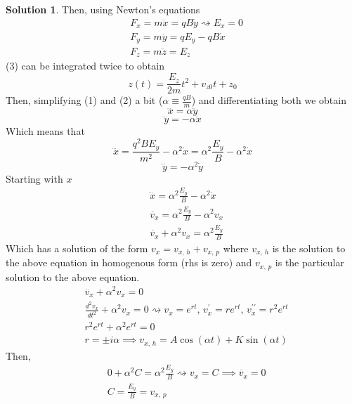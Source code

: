 \documentclass[10pt]{article}
\theoremstyle{definition}
\newtheorem{soln}{Solution}
\begin{document}
\begin{soln}
      Then, using Newton's equations
      \begin{align}
             & F_x=m\ddot{x}=qB\dot{y} \rightsquigarrow E_x=0 \\
             & F_y=m\ddot{y}=qE_y-qB\dot{x}                   \\
             & F_z=m\ddot{z}=E_z
      \end{align}
      (3) can be integrated twice to obtain $$z(t)=\frac{E_z}{2m}t^2+v_{z0}t+z_0$$
      Then, simplifying (1) and (2) a bit ($\alpha\equiv \displaystyle\frac{qB}{m}$) and differentiating both we obtain
      $$\dddot{x}=\alpha\ddot{y}$$
      $$\dddot{y}=-\alpha\ddot{x}$$
      Which means that
      $$\dddot{x}=\frac{q^2BE_y}{m^2}-\alpha^2\dot{x}=\alpha^2\frac{E_y}{B}-\alpha^2\dot{x}$$
      $$\dddot{y}=-\alpha^2\dot{y}$$
      Starting with $x$
      \begin{align*}
             & \dddot{x}=\alpha^2\frac{E_y}{B}-\alpha^2\dot{x} \\
             & \ddot{v_x}=\alpha^2\frac{E_y}{B}-\alpha^2v_x    \\
             & \ddot{v_x}+\alpha^2v_x=\alpha^2\frac{E_y}{B}
      \end{align*}
      Which has a solution of the form $v_x=v_{x, \,h}+v_{x, \,p}$ where $v_{x, \,h}$ is the solution to the above equation in homogenous form (rhs is zero) and $v_{x, \,p}$ is the particular solution to the above equation.
      \begin{align*}
             & \ddot{v_x}+\alpha^2v_x=0                                                                                              \\
             & \frac{d^2v_x}{dt^2}+\alpha^2v_x=0 \rightsquigarrow v_x=e^{r t},\, v_x^\prime=re^{rt},\, v_x^{\prime\prime}=r^2 e^{rt} \\
             & r^2 e^{rt}+\alpha^2e^{rt}=0                                                                                           \\
             & r=\pm i\alpha \implies v_{x,\,h}=A\cos\left(\alpha t\right)+K\sin\left(\alpha t\right)
      \end{align*}
      Then,
      \begin{align*}
             & 0+\alpha^2C=\alpha^2\frac{E_y}{B} \rightsquigarrow v_x=C \implies \ddot{v_x}=0 \\
             & C=\frac{E_y}{B}=v_{x,\,p}                                                      \\
      \end{align*}

\end{soln}
\end{document}
